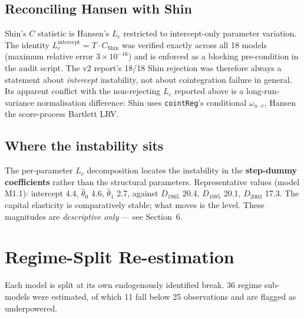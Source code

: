 \documentclass[11pt,a4paper]{article}
\begin{document}
\subsection{Reconciling Hansen with Shin}
Shin's $C$ statistic is Hansen's $L_c$ restricted to intercept-only parameter variation. The identity $L_c^{\text{intercept}} = T \cdot C_{\text{Shin}}$ was verified exactly across all 18 models (maximum relative error $3\times10^{-16}$) and is enforced as a blocking pre-condition in the audit script. The v2 report's 18/18 Shin rejection was therefore always a statement about \emph{intercept} instability, not about cointegration failure in general. Its apparent conflict with the non-rejecting $L_c$ reported above is a long-run-variance normalisation difference: Shin uses \texttt{cointReg}'s conditional $\omega_{u\cdot v}$, Hansen the score-process Bartlett LRV.

\subsection{Where the instability sits}
The per-parameter $L_c$ decomposition locates the instability in the \textbf{step-dummy coefficients} rather than the structural parameters. Representative values (model M1.1): intercept 4.4, $\hat\theta_0$ 4.6, $\hat\theta_1$ 2.7, against $D_{1965}$ 20.4, $D_{1985}$ 20.1, $D_{2003}$ 17.3. The capital elasticity is comparatively stable; what moves is the level. These magnitudes are \emph{descriptive only} --- see Section~6.

\FloatBarrier
\section{Regime-Split Re-estimation}
Each model is split at its own endogenously identified break. 36 regime sub-models were estimated, of which 11 fall below 25 observations and are flagged as underpowered.
\end{document}
